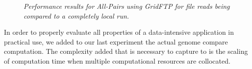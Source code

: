 \documentclass{rspublic}
\begin{document}
\begin{center}
\begin{figure}[ht]
\caption{\textit{Performance results for All-Pairs using GridFTP for
file reads being compared to a completely local run.}}
\label{Fig:ExpIConventionalLocal}
\end{figure}
\end{center}

\vspace{-0.2in}
In order to properly evaluate all properties of a data-intensive
application in practical use, we added to our last experiment the actual genome
compare computation. The complexity added that is necessary to capture to is
the scaling of computation time when multiple computational resources are
collocated.
\end{document}
